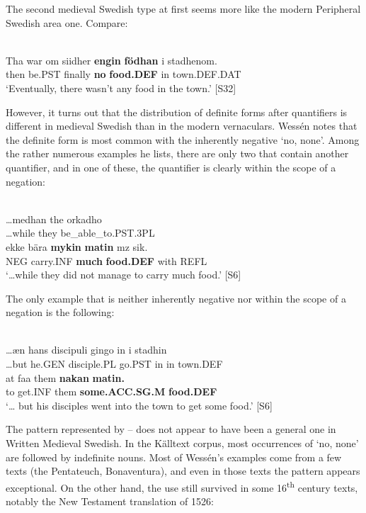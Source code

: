 The second medieval Swedish type at first seems more like the modern Peripheral Swedish area one. Compare:

\ea \label{} 
\\
\gll Tha  war  om siidher  \textbf{engin} \textbf{födhan} i  stadhenom.\\
then  be.PST  finally  \textbf{no} \textbf{food.DEF} in  town.DEF.DAT\\
\glt ‘Eventually, there wasn’t any food in the town.’ [S32]

\z

However, it turns out that the distribution of definite forms after quantifiers is different in medieval Swedish than in the modern vernaculars. Wessén notes that the definite form is most common with the inherently negative  ‘no, none’. Among the rather numerous examples he lists, there are only two that contain another quantifier, and in one of these, the quantifier is clearly within the scope of a negation: 

\ea \label{} 
\\
\gll …medhan  the  orkadho\\
…while  they  be\_able\_to.PST.3PL\\
\gll ekke  bära  \textbf{mykin} \textbf{  matin} mz  sik.\\
NEG  carry.INF  \textbf{much} \textbf{food.DEF} with  REFL\\
\glt  ‘…while they did not manage to carry much food.’ [S6]

\z

The only example that is neither inherently negative nor within the scope of a negation is the following:

\ea \label{} 
\\
\gll …æn  hans  discipuli  gingo  in  i  stadhin\\
…but  he.GEN  disciple.PL  go.PST  in  in  town.DEF\\
\gll at  faa  them  \textbf{nakan} \textbf{matin.}\\
to  get.INF  them  \textbf{some.ACC.SG.M} \textbf{food.DEF}\\
\glt ‘… but his disciples went into the town to get some food.’ [S6]

\z

The pattern represented by -- does not appear to have been a general one in Written Medieval Swedish. In the Källtext corpus, most occurrences of  ‘no, none’ are followed by indefinite nouns. Most of Wessén’s examples come from a few texts (the Pentateuch, Bonaventura), and even in those texts the pattern appears exceptional. On the other hand, the use still survived in some 16\textsuperscript{th} century texts, notably the New Testament translation of 1526:


